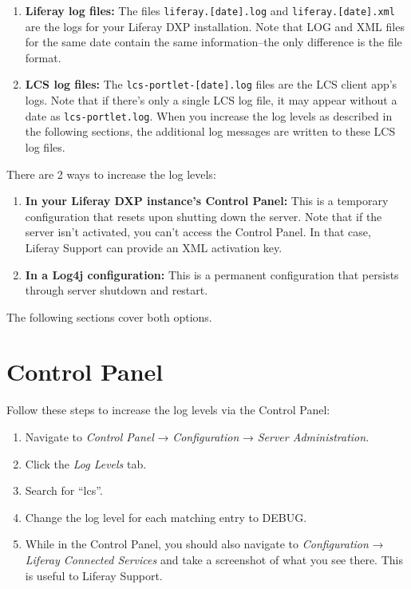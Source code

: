 \begin{enumerate}
\def\labelenumi{\arabic{enumi}.}
\item
  \textbf{Liferay log files:} The files \texttt{liferay.{[}date{]}.log}
  and \texttt{liferay.{[}date{]}.xml} are the logs for your Liferay DXP
  installation. Note that LOG and XML files for the same date contain
  the same information--the only difference is the file format.
\item
  \textbf{LCS log files:} The \texttt{lcs-portlet-{[}date{]}.log} files
  are the LCS client app's logs. Note that if there's only a single LCS
  log file, it may appear without a date as \texttt{lcs-portlet.log}.
  When you increase the log levels as described in the following
  sections, the additional log messages are written to these LCS log
  files.
\end{enumerate}

There are 2 ways to increase the log levels:

\begin{enumerate}
\def\labelenumi{\arabic{enumi}.}
\item
  \textbf{In your Liferay DXP instance's Control Panel:} This is a
  temporary configuration that resets upon shutting down the server.
  Note that if the server isn't activated, you can't access the Control
  Panel. In that case, Liferay Support can provide an XML activation
  key.
\item
  \textbf{In a Log4j configuration:} This is a permanent configuration
  that persists through server shutdown and restart.
\end{enumerate}

The following sections cover both options.

\section{Control Panel}\label{control-panel}

Follow these steps to increase the log levels via the Control Panel:

\begin{enumerate}
\def\labelenumi{\arabic{enumi}.}
\item
  Navigate to \emph{Control Panel} → \emph{Configuration} → \emph{Server
  Administration}.
\item
  Click the \emph{Log Levels} tab.
\item
  Search for ``lcs''.
\item
  Change the log level for each matching entry to DEBUG.
\item
  While in the Control Panel, you should also navigate to
  \emph{Configuration} → \emph{Liferay Connected Services} and take a
  screenshot of what you see there. This is useful to Liferay Support.
\end{enumerate}

